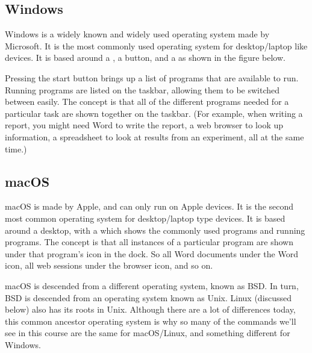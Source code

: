 \documentclass[letterpaper,10pt,british]{sphinxmanual}
\let\sphinxpxdimen\pdfpxdimen\else\newdimen\sphinxpxdimen
\begin{document}
\subsection{Windows}
\label{\detokenize{chapters/computer_software/major_operating_systems:windows}}
\sphinxAtStartPar
Windows is a widely known and widely used operating system made by Microsoft. It is the most commonly used operating system for desktop/laptop like devices. It is based around a , a  button, and a  as shown in the figure below.

\sphinxAtStartPar
Pressing the start button brings up a list of programs that are available to run. Running programs are listed on the taskbar, allowing them to be switched between easily. The concept is that all of the different programs needed for a particular task are shown together on the taskbar. (For example, when writing a report, you might need Word to write the report, a web browser to look up information, a spreadsheet to look at results from an experiment, all at the same time.)

\begin{figure}[htbp]
\centering

\noindent\sphinxincludegraphics[width=800\sphinxpxdimen]{{windows_desktop}.png}
\end{figure}


\subsection{macOS}
\label{\detokenize{chapters/computer_software/major_operating_systems:macos}}
\sphinxAtStartPar
macOS is made by Apple, and can only run on Apple devices. It is the second most common operating system for desktop/laptop type devices. It is based around a desktop, with a  which shows the commonly used programs and running programs. The concept is that all instances of a particular program are shown under that program’s icon in the dock. So all Word documents under the Word icon, all web sessions under the browser icon, and so on.

\begin{figure}[htbp]
\centering

\noindent\sphinxincludegraphics[width=800\sphinxpxdimen]{{macos_desktop}.png}
\end{figure}

\sphinxAtStartPar
macOS is descended from a different operating system, known as BSD. In turn, BSD is descended from an operating system known as Unix. Linux (discussed below) also has its roots in Unix. Although there are a lot of differences today, this common ancestor operating system is why so many of the commands we’ll see in this course are the same for macOS/Linux, and something different for Windows.
\end{document}
